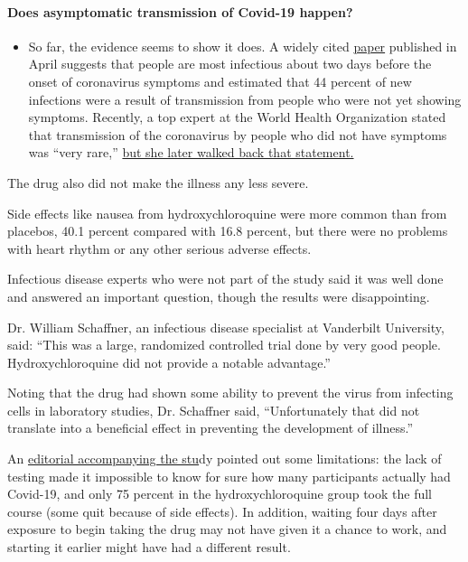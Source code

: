 \begin{itemize}
{  \paragraph{Does asymptomatic transmission of Covid-19
  happen?}\label{does-asymptomatic-transmission-of-covid-19-happen}}

  \begin{itemize}
  \tightlist
  \item
    So far, the evidence seems to show it does. A widely cited
    \href{https://www.nature.com/articles/s41591-020-0869-5}{paper}
    published in April suggests that people are most infectious about
    two days before the onset of coronavirus symptoms and estimated that
    44 percent of new infections were a result of transmission from
    people who were not yet showing symptoms. Recently, a top expert at
    the World Health Organization stated that transmission of the
    coronavirus by people who did not have symptoms was ``very rare,''
    \href{https://www.nytimes3xbfgragh.onion/2020/06/09/world/coronavirus-updates.html?action=click\&pgtype=Article\&state=default\&region=MAIN_CONTENT_3\&context=storylines_faq\#link-1f302e21}{but
    she later walked back that statement.}
  \end{itemize}
\end{itemize}

The drug also did not make the illness any less severe.

Side effects like nausea from hydroxychloroquine were more common than
from placebos, 40.1 percent compared with 16.8 percent, but there were
no problems with heart rhythm or any other serious adverse effects.

Infectious disease experts who were not part of the study said it was
well done and answered an important question, though the results were
disappointing.

Dr. William Schaffner, an infectious disease specialist at Vanderbilt
University, said: ``This was a large, randomized controlled trial done
by very good people. Hydroxychloroquine did not provide a notable
advantage.''

Noting that the drug had shown some ability to prevent the virus from
infecting cells in laboratory studies, Dr. Schaffner said,
``Unfortunately that did not translate into a beneficial effect in
preventing the development of illness.''

An \href{https://www.nejm.org/doi/full/10.1056/NEJMe2020388}{editorial
accompanying the stu}dy pointed out some limitations: the lack of
testing made it impossible to know for sure how many participants
actually had Covid-19, and only 75 percent in the hydroxychloroquine
group took the full course (some quit because of side effects). In
addition, waiting four days after exposure to begin taking the drug may
not have given it a chance to work, and starting it earlier might have
had a different result.

